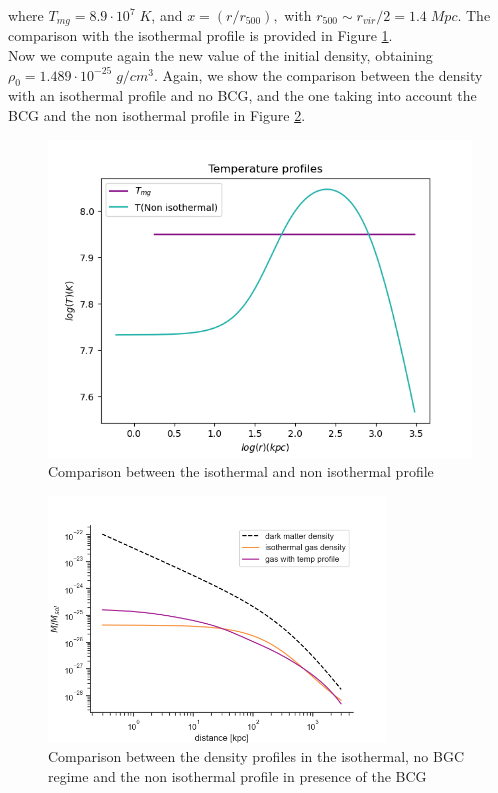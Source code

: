 \documentclass{article}
\begin{document}
where \(T_{mg}=8.9\cdot 10^{7}\;K\), and  \(x=(r/r_{500}),\) with \(r_{500}\sim r_{vir}/2=1.4 \; Mpc\).
The comparison with the isothermal profile is provided in Figure \ref{fig:figure3}.\\Now we compute again the new value of the initial density, obtaining \(\rho_{0}=1.489 \cdot 10^{-25}\; g/cm^{3}\). Again, we show the comparison between the density with an isothermal profile and no BCG, and the one taking into account the BCG and the non isothermal profile in Figure \ref{fig:figure4}.






\begin{figure}[hb]

\includegraphics[width=12 cm]{temp1}
\caption{Comparison between the isothermal and non isothermal profile}
\label{fig:figure3}
\end{figure}

\begin{figure}
\includegraphics[width=0.8\textwidth, trim = 0 0 0 30]{gas1.png}
\caption{Comparison between the density profiles in the isothermal, no BGC regime and the non isothermal profile in presence of the BCG}
\label{fig:figure4}

\end{figure}
\end{document}
